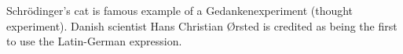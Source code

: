 \documentclass[a4paper, 12pt]{article}
\begin{document}
Schrödinger's cat is famous example of a Gedankenexperiment (thought experiment). Danish scientist Hans Christian Ørsted is credited as being the first to use the Latin-German expression.
\end{document}

